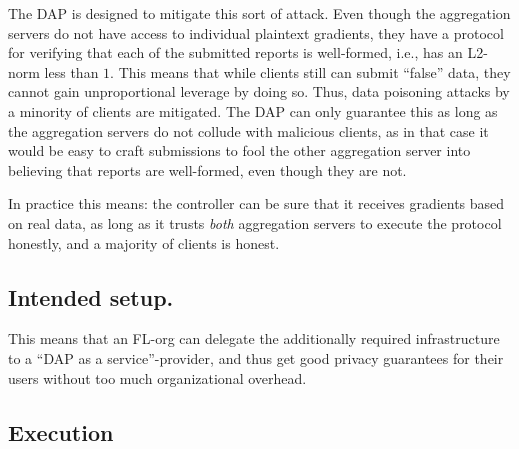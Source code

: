 \documentclass{article}
\begin{document}
The DAP is designed to mitigate this sort of attack. Even though the aggregation
servers do not have access to individual plaintext gradients, they have a
protocol for verifying that each of the submitted reports is well-formed, i.e.,
has an L2-norm less than $1$. This means that while clients still can submit
``false'' data, they cannot gain unproportional leverage by doing so. Thus, data
poisoning attacks by a minority of clients are mitigated. The DAP can only
guarantee this as long as the aggregation servers do not collude with malicious
clients, as in that case it would be easy to craft submissions to fool the other
aggregation server into believing that reports are well-formed, even though they
are not.

In practice this means: the controller can be sure that it receives gradients
based on real data, as long as it trusts \textit{both} aggregation servers to
execute the protocol honestly, and a majority of clients is honest.

\subsection{Intended setup.}

This means that an FL-org can delegate the additionally required infrastructure
to a ``DAP as a service''-provider, and thus get good privacy guarantees for
their users without too much organizational overhead.

\subsection{Execution}
\end{document}
